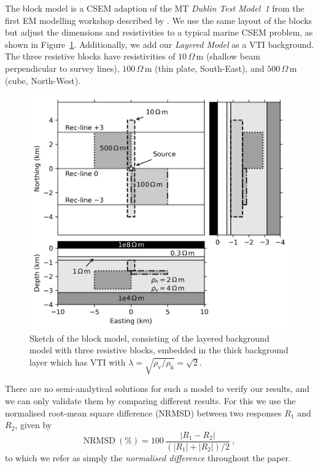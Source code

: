 \documentclass[extra, camera,%
]{gji}
\newlength{\cwidth}
\newcommand{\mr}[1]{\mathrm{#1}}
\newcommand{\ohmm}{\ensuremath{\Omega\,}\text{m}\xspace}
\begin{document}
The block model is a CSEM adaption of the MT \emph{Dublin Test Model~1} from the first EM modelling workshop described by \cite{GJI.13.Miensopust}. We use the same layout of the blocks but adjust the dimensions and resistivities to a typical marine CSEM problem, as shown in Figure~\ref{fig:model-block}. Additionally, we add our \emph{Layered Model} as a VTI background. The three resistive blocks have resistivities of $10\,\ohmm$ (shallow beam perpendicular to survey lines), $100\,\ohmm$ (thin plate, South-East), and $500\,\ohmm$ (cube, North-West).
%
\begin{figure}
  \centering
  \includegraphics[width=\cwidth]{figures/model-block.png}
  \caption{Sketch of the block model, consisting of the layered background model with three resistive blocks, embedded in the thick background layer which has VTI with $\lambda=\sqrt{\rho_\textrm{v}/\rho_\textrm{h}}=\sqrt{2}$.}
  \label{fig:model-block}
\end{figure}
%

There are no semi-analytical solutions for such a model to verify our results, and we can only validate them by comparing different results. For this we use the normalised root-mean square difference (NRMSD) between two responses $R_1$ and $R_2$, given by
%
\begin{equation}
  \mr{NRMSD~(\%)} = 100\,\frac{|R_1 - R_2|}{(|R_1| + |R_2|)/2} \ ,
  \label{eq:nrmsd}
\end{equation}
%
to which we refer as simply the \emph{normalised difference} throughout the paper.
\end{document}
